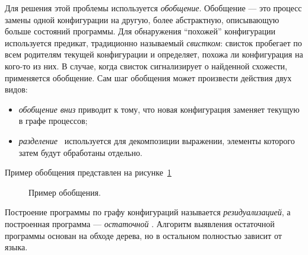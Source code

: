 Для решения этой проблемы используется \emph{обобщение}\cite{scGen}. Обобщение --- это процесс
замены одной конфигурации на другую, более абстрактную, описывающую больше состояний
программы. Для обнаружения ``похожей'' конфигурации используется предикат,
традиционно называемый \emph{свистком}: свисток пробегает по всем
родителям текущей конфигурации и определяет, похожа ли конфигурация на кого-то из них.
В случае, когда свисток сигнализирует о найденной схожести, применяется обобщение.
Сам шаг обобщения может произвести действия двух видов:
\begin{itemize}
\item \emph{обобщение вниз} приводит к тому, что новая конфигурация заменяет текущую в графе процессов;
\item \emph{разделение}~ используется для декомпозиции выражении, элементы которого затем
будут обработаны отдельно.
\end{itemize}
Пример обобщения представлен на рисунке~\ref{fig:pgraphGenExample}
\begin{figure}[h!]
\center
{}


\caption{Пример обобщения.}
\label{fig:pgraphGenExample}
\end{figure}

Построение программы по графу конфигураций называется \emph{резидуализацией}, а
построенная программа --- \emph{остаточной} .
Алгоритм выявления остаточной программы основан на обходе дерева, но
в остальном полностью зависит от языка.

